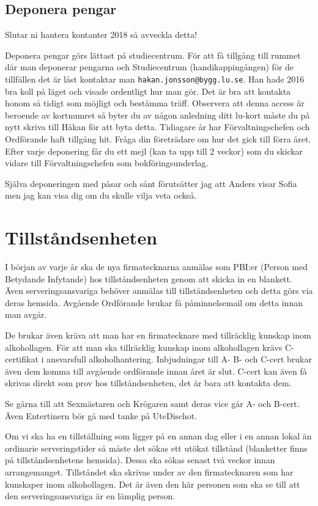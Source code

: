 \documentclass[10pt]{article}
\begin{document}
\subsection{Deponera pengar}

Slutar ni hantera kontanter 2018 så avveckla detta!

Deponera pengar görs lättast på studiecentrum. För att få tillgång till rummet där man deponerar pengarna och Studiecentrum (handikappingången) för de tillfällen det är låst kontaktar man \texttt{hakan.jonsson@bygg.lu.se}. Han hade 2016 bra koll på läget och visade ordentligt hur man gör. Det är bra att kontakta honom så tidigt som möjligt och bestämma träff. Observera att denna access är beroende av kortnumret så byter du av någon anledning ditt lu-kort måste du på nytt skriva till Håkan för att byta detta. Tidiagare år har Förvaltningschefen och Ordförande haft tillgång hit. Fråga din företrädare om hur det gick till förra året. Efter varje deponering får du ett mejl (kan ta upp till 2 veckor) som du skickar vidare till Förvaltningschefen som bokföringsunderlag.

Själva deponeringen med påsar och sånt förutsätter jag att Anders visar Sofia men jag kan visa dig om du skulle vilja veta också.

\section{Tillståndsenheten}

I början av varje år ska de nya firmatecknarna anmälas som PBI:er (Person med Betydande Infytande) hos tillståndsenheten genom att skicka in en blankett. Även serveringsansvariga behöver anmälas till tillståndsenheten och detta görs via deras hemsida. Avgående Ordförande brukar få påminnelsemail om detta innan man avgår.

De brukar även kräva att man har en firmatecknare med tillräcklig kunskap inom alkohollagen. För att man ska tillräcklig kunskap inom alkohollagen krävs C-certifikat i ansvarsfull alkoholhantering. Inbjudningar till A- B- och C-cert brukar även dem komma till avgående ordförande innan året är slut. C-cert kan även få skrivas direkt som prov hos tillståndsenheten, det är bara att kontakta dem.

Se gärna till att Sexmästaren och Krögaren samt deras vice går A- och B-cert. Även Entertinern bör gå med tanke på UteDischot.

Om vi ska ha en tillställning som ligger på en annan dag eller i en annan lokal än ordinarie serveringstider så måste det sökas ett utökat tillstånd (blanketter finns på tillståndsenhetens hemsida). Dessa ska sökas senast två veckor innan arrangemanget. Tillståndet ska skrivas under av den firmatecknaren som har kunskaper inom alkohollagen. Det är även den här personen som ska se till att den serveringsansvariga är en lämplig person.
\end{document}
